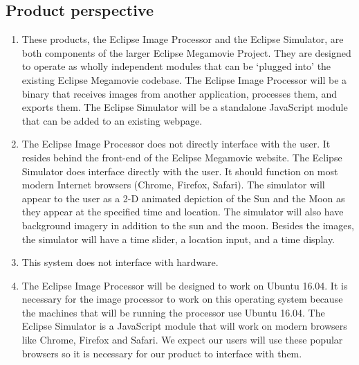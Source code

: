\documentclass[10pt, onecolumn, draftclsnofoot, letterpaper, compsoc]{IEEEtran}
\begin{document}
\subsection{Product perspective}
	\begin{enumerate}
		\item These products, the Eclipse Image Processor and the 
		Eclipse Simulator, are both components of the larger Eclipse 
		Megamovie Project. They are designed to operate as wholly 
		independent modules that can be ‘plugged into’ the existing 
		Eclipse Megamovie codebase. The Eclipse Image Processor will be
		a binary that receives images from another application, 
		processes them, and exports them. The Eclipse Simulator will 
		be a standalone JavaScript module that can be added to an 
		existing webpage.

		\item The Eclipse Image Processor does not directly interface
		with the user. It resides behind the front-end of the Eclipse
		Megamovie website. The Eclipse Simulator does interface 
		directly with the user. It should function on most modern 
		Internet browsers (Chrome, Firefox, Safari). The simulator 
		will appear to the user as a 2-D animated depiction of the 
		Sun and the Moon as they appear at the specified time and 
		location. The simulator will also have background imagery in
		addition to the sun and the moon. Besides the images, the
		simulator will have a time slider, a location input, and a
		time display.

		\item This system does not interface with hardware.

		\item The Eclipse Image Processor will be designed to work on
		Ubuntu 16.04. It is necessary for the image processor to 
		work on this operating system because the machines that will
		be running the processor use Ubuntu 16.04. The Eclipse 
		Simulator is a JavaScript module that will work on modern 
		browsers like Chrome, Firefox and Safari. We expect our 
		users will use these popular browsers so it is necessary 
		for our product to interface with them.      
	\end{enumerate}
\end{document}
